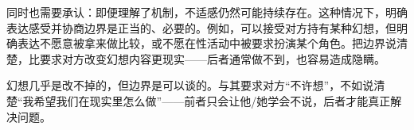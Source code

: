 同时也需要承认：即便理解了机制，不适感仍然可能持续存在。这种情况下，明确表达感受并协商边界是正当的、必要的。例如，可以接受对方持有某种幻想，但明确表达不愿意被拿来做比较，或不愿在性活动中被要求扮演某个角色。把边界说清楚，比要求对方改变幻想内容更现实——后者通常做不到，也容易造成隐瞒。

\begin{tcolorbox}[colback=pink!5!white,colframe=red!50!black,title=贴心小叮咛]
幻想几乎是改不掉的，但边界是可以谈的。与其要求对方“不许想”，不如说清楚“我希望我们在现实里怎么做”——前者只会让他/她学会不说，后者才能真正解决问题。
\end{tcolorbox}
